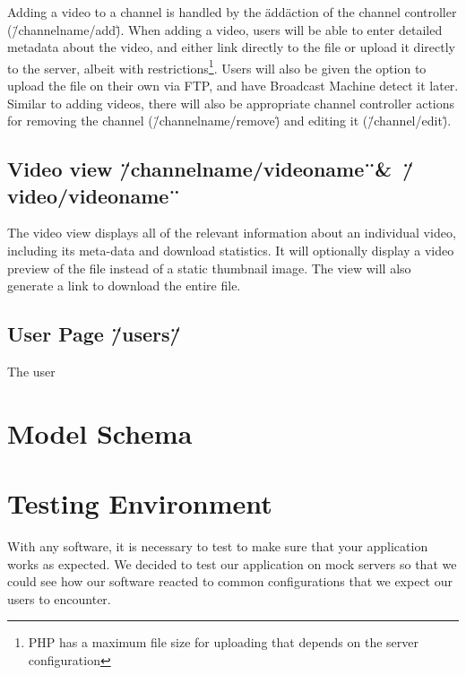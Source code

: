 \documentclass[a4paper,12pt]{report}
\begin{document}
Adding a video to a channel is handled by the \"add\" action of the channel controller (\"/channelname/add\").
When adding a video, users will be able to enter detailed metadata about the video, and either link directly to the file or upload it directly to the server, albeit with restrictions\footnote{PHP has a maximum file size for uploading that depends on the server configuration}.
Users will also be given the option to upload the file on their own via FTP, and have Broadcast Machine detect it later.
Similar to adding videos, there will also be appropriate channel controller actions for removing the channel (\"/channelname/remove\") and editing it (\"/channel/edit\").


\subsection{Video view \"/channelname/videoname\"\ \&\ \"/video/videoname\"\ }
The video view displays all of the relevant information about an individual video, including its meta-data and download statistics.
It will optionally display a video preview of the file instead of a static thumbnail image. The view will also generate a link to download the entire file.


\subsection{User Page \"/users/\"}
The user


\section{Model Schema}

\section{Testing Environment}
With any software, it is necessary to test to make sure that your application works as expected.
We decided to test our application on mock servers so that we could see how our software reacted to common configurations that we expect our users to encounter.
\end{document}

